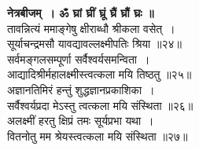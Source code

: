 \documentclass[twoside,top=1.7cm, bottom=1.7cm, outer=1cm,landscape, inner=1.5cm,a5paper,]{book}
\begin{document}
\begin{center}
{\bfseries नेत्रबीजम्~। ॐ घ्रां घ्रीं घ्रूं घ्रैं घ्रौं घ्रः ॥}\\[10pt]

तावन्नित्यं ममाङ्गेषु क्षीराब्धौ श्रीकला वसेत्~।\\
सूर्याचन्द्रमसौ यावद्यावल्लक्ष्मीपतिः श्रिया ॥२४॥\\[10pt]

सर्वमङ्गलसम्पूर्णा सर्वैश्वर्यसमन्विता~।\\
आद्यादिश्रीर्महालक्ष्मीस्त्वत्कला मयि तिष्ठतु ॥२५॥\\[10pt]

अज्ञानतिमिरं हन्तुं शुद्धज्ञानप्रकाशिका~।\\
सर्वैश्वर्यप्रदा मेऽस्तु त्वत्कला मयि संस्थिता ॥२६॥\\[10pt]

अलक्ष्मीं हरतु क्षिप्रं तमः सूर्यप्रभा यथा~।\\
वितनोतु मम श्रेयस्त्वत्कला मयि संस्थिता ॥२७॥\\[10pt]


\end{center}
\end{document}
